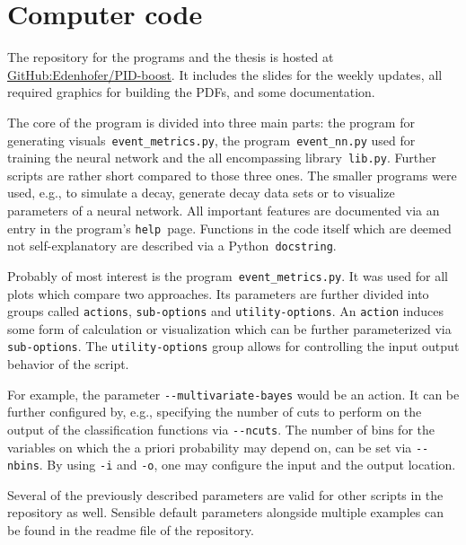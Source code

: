 \chapter{Computer code}
\label{chap:computer_code}

The repository for the programs and the thesis is hosted at \href{https://github.com/Edenhofer/PID-boost}{GitHub:Edenhofer/PID-boost}. It includes the slides for the weekly updates, all required graphics for building the PDFs, and some documentation.

The core of the program is divided into three main parts: the program for generating visuals~\lstinline|event_metrics.py|, the program~\lstinline|event_nn.py| used for training the neural network and the all encompassing library~\lstinline|lib.py|. Further scripts are rather short compared to those three ones. The smaller programs were used, e.g., to simulate a decay, generate decay data sets or to visualize parameters of a neural network. All important features are documented via an entry in the program's \lstinline|help|~page. Functions in the code itself which are deemed not self-explanatory are described via a Python~\lstinline|docstring|.

Probably of most interest is the program~\lstinline|event_metrics.py|. It was used for all plots which compare two approaches. Its parameters are further divided into groups called \lstinline|actions|, \lstinline|sub-options| and \lstinline|utility-options|. An \lstinline|action| induces some form of calculation or visualization which can be further parameterized via \lstinline|sub-options|. The \lstinline|utility-options| group allows for controlling the input output behavior of the script.

For example, the parameter \lstinline|--multivariate-bayes| would be an action. It can be further configured by, e.g., specifying the number of cuts to perform on the output of the classification functions via \lstinline|--ncuts|. The number of bins for the variables on which the a priori probability may depend on, can be set via \lstinline|--nbins|. By using \lstinline|-i| and \lstinline|-o|, one may configure the input and the output location.

Several of the previously described parameters are valid for other scripts in the repository as well. Sensible default parameters alongside multiple examples can be found in the readme file of the repository.
